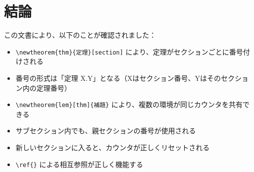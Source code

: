 \documentclass[master]{kuisthesis}
\begin{document}
\section{結論}

この文書により、以下のことが確認されました：
\begin{itemize}
\item \verb|\newtheorem{thm}{定理}[section]| により、定理がセクションごとに番号付けされる
\item 番号の形式は「定理 X.Y」となる（Xはセクション番号、Yはそのセクション内の定理番号）
\item \verb|\newtheorem{lem}[thm]{補題}| により、複数の環境が同じカウンタを共有できる
\item サブセクション内でも、親セクションの番号が使用される
\item 新しいセクションに入ると、カウンタが正しくリセットされる
\item \verb|\ref{}| による相互参照が正しく機能する
\end{itemize}
\end{document}
